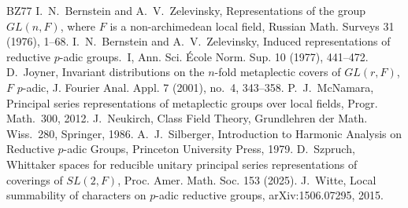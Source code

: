 \documentclass[12pt,letterpaper]{article}
\begin{document}
\begin{thebibliography}{BZ77}
 I.~N.~Bernstein and A.~V.~Zelevinsky,
Representations of the group $GL(n,F)$, where $F$ is a
non-archimedean local field, Russian Math. Surveys 31 (1976), 1--68.
 I.~N.~Bernstein and A.~V.~Zelevinsky, Induced
representations of reductive $p$-adic groups.~I, Ann. Sci. \'Ecole
Norm. Sup. 10 (1977), 441--472.
 D.~Joyner, Invariant distributions on the $n$-fold
metaplectic covers of $GL(r,F)$, $F$ $p$-adic, J. Fourier Anal. Appl. 7
(2001), no.~4, 343--358.
 P.~J.~McNamara, Principal series representations
of metaplectic groups over local fields, Progr. Math.~300, 2012.
 J.~Neukirch, Class Field Theory, Grundlehren der
Math. Wiss.~280, Springer, 1986.
 A.~J.~Silberger, Introduction to Harmonic
Analysis on Reductive $p$-adic Groups, Princeton University Press,
1979.
 D.~Szpruch, Whittaker spaces for reducible unitary
principal series representations of coverings of $SL(2,F)$, Proc.
Amer. Math. Soc. 153 (2025).
 J.~Witte, Local summability of characters on
$p$-adic reductive groups, arXiv:1506.07295, 2015.
\end{thebibliography}
\end{document}
